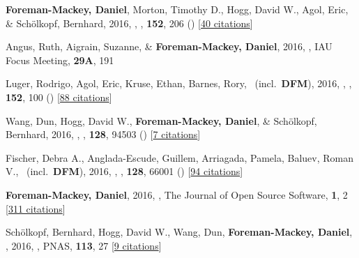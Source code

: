 \item[{\color{numcolor}\scriptsize22}] \textbf{Foreman-Mackey, Daniel}, Morton, Timothy D., Hogg, David W., Agol, Eric, \& Sch{\"o}lkopf, Bernhard, 2016, , \aj, \textbf{152}, 206 () [\href{http://adsabs.harvard.edu/abs/2016AJ....152..206F}{40 citations}]

\item[{\color{numcolor}\scriptsize21}] Angus, Ruth, Aigrain, Suzanne, \& \textbf{Foreman-Mackey, Daniel}, 2016, , IAU Focus Meeting, \textbf{29A}, 191

\item[{\color{numcolor}\scriptsize20}] Luger, Rodrigo, Agol, Eric, Kruse, Ethan, Barnes, Rory, \etal\ (incl.\ \textbf{DFM}), 2016, , \aj, \textbf{152}, 100 () [\href{http://adsabs.harvard.edu/abs/2016AJ....152..100L}{88 citations}]

\item[{\color{numcolor}\scriptsize19}] Wang, Dun, Hogg, David W., \textbf{Foreman-Mackey, Daniel}, \& Sch{\"o}lkopf, Bernhard, 2016, , \pasp, \textbf{128}, 94503 () [\href{http://adsabs.harvard.edu/abs/2016PASP..128i4503W}{7 citations}]

\item[{\color{numcolor}\scriptsize18}] Fischer, Debra A., Anglada-Escude, Guillem, Arriagada, Pamela, Baluev, Roman V., \etal\ (incl.\ \textbf{DFM}), 2016, , \pasp, \textbf{128}, 66001 () [\href{http://adsabs.harvard.edu/abs/2016PASP..128f6001F}{94 citations}]

\item[{\color{numcolor}\scriptsize17}] \textbf{Foreman-Mackey, Daniel}, 2016, , The Journal of Open Source Software, \textbf{1}, 2 [\href{https://scholar.google.com/scholar?cites=1835087844145558435,9294978791003210998,17836006976722650130,12820425635803494730}{311 citations}]

\item[{\color{numcolor}\scriptsize16}] Sch{\"o}lkopf, Bernhard, Hogg, David W., Wang, Dun, \textbf{Foreman-Mackey, Daniel}, \etal, 2016, , PNAS, \textbf{113}, 27 [\href{https://scholar.google.com/scholar?cites=2429561747341807338}{9 citations}]

